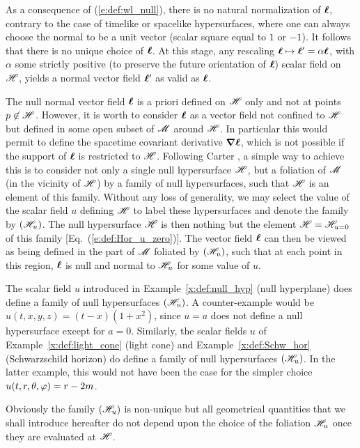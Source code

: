 \begin{remark}
As a consequence of (\ref{e:def:wl_null}), there is no natural normalization
of $\bm{\ell}$, contrary to the case of timelike or spacelike hypersurfaces,
where one can always choose the normal to be a unit vector
(scalar square equal to $1$ or $-1$). It follows that there is no unique choice
of $\bm{\ell}$. At this stage, any rescaling $\bm{\ell} \mapsto \bm{\ell}' =  \alpha \bm{\ell}$, with
$\alpha$ some strictly positive (to preserve the future orientation of $\bm{\ell}$)
scalar field on $\mathscr{H}$,
yields a normal vector field $\bm{\ell}'$ as valid as $\bm{\ell}$.
\end{remark}
The null normal vector field $\bm{\ell}$ is a priori defined on $\mathscr{H}$
only and not at points $p\not\in\mathscr{H}$.
However, it is worth to consider $\bm{\ell}$ as a vector field
not confined to $\mathscr{H}$ but defined
in some open subset of $\mathscr{M}$ around $\mathscr{H}$.
In particular this would permit to define the spacetime covariant
derivative $\bm{\nabla}\bm{\ell}$, which is not possible if the
support of $\bm{\ell}$ is restricted to $\mathscr{H}$.
Following Carter \cite{Carte97}, a simple way to achieve
this is to consider not only a single null hypersurface $\mathscr{H}$,
but a foliation of $\mathscr{M}$ (in the vicinity
of $\mathscr{H}$) by a family of null hypersurfaces, such that $\mathscr{H}$ is an
element of this family.
Without any loss of generality,
we may select the value of the scalar field $u$ defining $\mathscr{H}$ to label these hypersurfaces and
denote the family by $(\mathscr{H}_u)$. The null hypersurface $\mathscr{H}$
is then nothing but the element $\mathscr{H} = \mathscr{H}_{u=0}$ of this family
[Eq.~(\ref{e:def:Hor_u_zero})].
The vector field $\bm{\ell}$ can then be viewed as being defined in the part of $\mathscr{M}$
foliated by $(\mathscr{H}_u)$, such that at each point in this region, $\bm{\ell}$
is null and normal to $\mathscr{H}_u$ for some value of $u$.

\begin{example}
The scalar field $u$ introduced in Example~\ref{x:def:null_hyp}
(null hyperplane) does define a family of null hypersurfaces
$(\mathscr{H}_u)$. A counter-example would be $u(t,x,y,z)=(t-x)(1+x^2)$, since
$u=a$ does not define a null hypersurface except for $a=0$.
Similarly, the scalar fields $u$ of
Example~\ref{x:def:light_cone} (light cone)
and Example~\ref{x:def:Schw_hor} (Schwarzschild horizon)
do define a family of null
hypersurfaces $(\mathscr{H}_u)$. In the latter example, this would not have been the
case for the simpler choice $u(t,r,\theta,\varphi)  = r - 2m$.
\end{example}

Obviously the family $(\mathscr{H}_u)$ is non-unique but all geometrical
quantities that we shall introduce hereafter do not depend upon the choice
of the foliation $\mathscr{H}_u$ once they are evaluated at $\mathscr{H}$.

